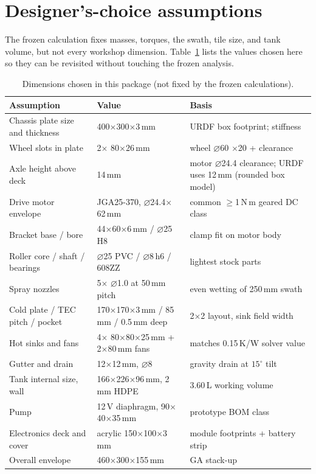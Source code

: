 \documentclass[11pt,a4paper]{article}
\begin{document}
\section{Designer's-choice assumptions}
The frozen calculation fixes masses, torques, the swath, tile size, and tank
volume, but not every workshop dimension. Table~\ref{tab:assumptions} lists
the values chosen here so they can be revisited without touching the frozen
analysis.

\begin{table}[h]
\centering
\caption{Dimensions chosen in this package (not fixed by the frozen
calculations).}
\label{tab:assumptions}
\small
\begin{tabular}{p{}p{}p{}}
\toprule
Assumption & Value & Basis \\
\midrule
Chassis plate size and thickness & 400$\times$300$\times$3\,mm & URDF box
footprint; stiffness \\
Wheel slots in plate & 2$\times$ 80$\times$26\,mm & wheel $\varnothing$60
$\times$20 + clearance \\
Axle height above deck & 14\,mm & motor $\varnothing$24.4 clearance; URDF
uses 12\,mm (rounded box model) \\
Drive motor envelope & JGA25-370, $\varnothing$24.4$\times$62\,mm & common
$\geq$1\,N\,m geared DC class \\
Bracket base / bore & 44$\times$60$\times$6\,mm / $\varnothing$25\,H8 &
clamp fit on motor body \\
Roller core / shaft / bearings & $\varnothing$25 PVC / $\varnothing$8\,h6 /
608ZZ & lightest stock parts \\
Spray nozzles & 5$\times$ $\varnothing$1.0 at 50\,mm pitch & even wetting of
250\,mm swath \\
Cold plate / TEC pitch / pocket & 170$\times$170$\times$3\,mm / 85\,mm /
0.5\,mm deep & 2$\times$2 layout, sink field width \\
Hot sinks and fans & 4$\times$ 80$\times$80$\times$25\,mm + 2$\times$80\,mm
fans & matches 0.15\,K/W solver value \\
Gutter and drain & 12$\times$12\,mm, $\varnothing$8 & gravity drain at
$15^\circ$ tilt \\
Tank internal size, wall & 166$\times$226$\times$96\,mm, 2\,mm HDPE &
3.60\,L working volume \\
Pump & 12\,V diaphragm, 90$\times$40$\times$35\,mm & prototype BOM class \\
Electronics deck and cover & acrylic 150$\times$100$\times$3\,mm & module
footprints + battery strip \\
Overall envelope & 460$\times$300$\times$155\,mm & GA stack-up \\
\bottomrule
\end{tabular}
\end{table}
\end{document}
